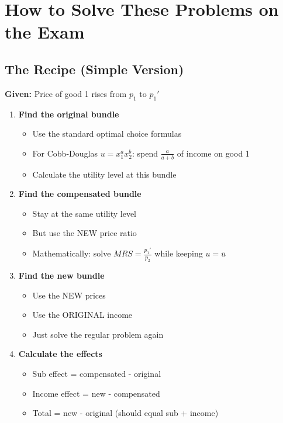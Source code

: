 \documentclass[12pt]{article}
\begin{document}
\newpage

\section*{How to Solve These Problems on the Exam}

\subsection*{The Recipe (Simple Version)}

\textbf{Given:} Price of good 1 rises from $p_1$ to $p_1'$

\begin{enumerate}[leftmargin=*]
\item \textbf{Find the original bundle}
\begin{itemize}
\item Use the standard optimal choice formulas
\item For Cobb-Douglas $u = x_1^a x_2^b$: spend $\frac{a}{a+b}$ of income on good 1
\item Calculate the utility level at this bundle
\end{itemize}

\item \textbf{Find the compensated bundle}
\begin{itemize}
\item Stay at the same utility level
\item But use the NEW price ratio
\item Mathematically: solve $MRS = \frac{p_1'}{p_2}$ while keeping $u = \bar{u}$
\end{itemize}

\item \textbf{Find the new bundle}
\begin{itemize}
\item Use the NEW prices
\item Use the ORIGINAL income
\item Just solve the regular problem again
\end{itemize}

\item \textbf{Calculate the effects}
\begin{itemize}
\item Sub effect = compensated - original
\item Income effect = new - compensated
\item Total = new - original (should equal sub + income)
\end{itemize}
\end{enumerate}
\end{document}
